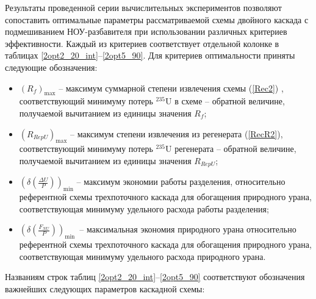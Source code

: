 Результаты проведенной серии вычислительных экспериментов позволяют сопоставить оптимальные параметры рассматриваемой схемы двойного каскада с подмешиванием НОУ-разбавителя при использовании различных критериев эффективности. Каждый из критериев соответствует отдельной колонке в таблицах \ref{2opt2_20_int}--\ref{2opt5_90}. Для критериев оптимальности приняты следующие обозначения:

\begin{itemize}
    \item $(R_f)_\text{max}$ -- максимум суммарной степени извлечения схемы (\ref{Rec2}) , соответствующий минимуму потерь $^{235}$U в схеме -- обратной величине, получаемой вычитанием из единицы значения $R_f$;
    \item $(R_{RepU})_\text{max}$ -- максимум степени извлечения из регенерата (\ref{RecR2}), соответствующий минимуму потерь $^{235}$U регенерата -- обратной величине, получаемой вычитанием из единицы значения $R_{RepU}$;
    \item $(\delta(\frac{\Delta U}{P}))_\text{min}$ -- максимум экономии работы разделения, относительно референтной схемы трехпоточного каскада для обогащения природного урана, соответствующая минимуму удельного расхода работы разделения; 
    \item $(\delta(\frac{F_{NU}}{P}))_\text{min}$\ -- максимальная экономия природного урана относительно референтной схемы трехпоточного каскада для обогащения природного урана, соответствующая минимуму удельного расхода природного урана.
\end{itemize}\label{criteria_list}

Названиям строк таблиц \ref{2opt2_20_int}--\ref{2opt5_90} соответствуют обозначения важнейших следующих параметров каскадной схемы:

